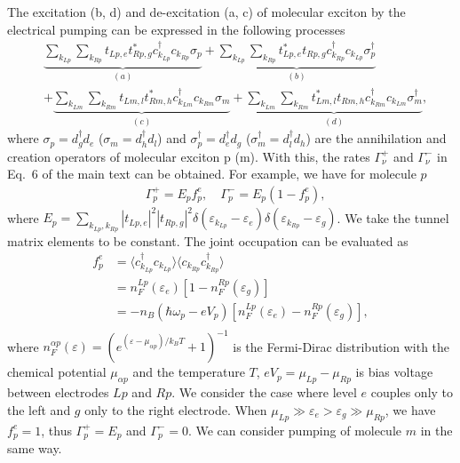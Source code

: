 \documentclass[aps,prb,
superscriptaddress,
,floatfix,footinbib,longbibliography,
preprint
]{revtex4-2}
\begin{document}
{The excitation (b, d) and de-excitation (a, c) of molecular exciton by the electrical pumping can be expressed in the following processes 
\begin{equation}
\begin{split}
&\underbrace{\sum_{k_{Lp}}\sum_{k_{Rp}}t_{Lp,e}t_{Rp,g}^{\ast}c_{k_{Lp}}^{\dagger}c_{k_{Rp}}\sigma_p}_{(a)}+\underbrace{\sum_{k_{Lp}}\sum_{k_{Rp}}t_{Lp,e}^{\ast}t_{Rp,g}c_{k_{Rp}}^{\dagger}c_{k_{Lp}}\sigma_p^\dagger}_{(b)}\\
&+\underbrace{\sum_{k_{Lm}}\sum_{k_{Rm}}t_{Lm,l}t_{Rm,h}^{\ast}c_{k_{Lm}}^{\dagger}c_{k_{Rm}}\sigma_m}_{(c)}+\underbrace{\sum_{k_{Lm}}\sum_{k_{Rm}}t_{Lm,l}^{\ast}t_{Rm,h}c_{k_{Rm}}^{\dagger}c_{k_{Lm}}\sigma_m^\dagger}_{(d)},
\end{split}
\label{exciton-electrode}
\end{equation}
where $\sigma_p = d_{g}^{\dagger}d_{e}$ ($\sigma_m=d_{h}^{\dagger}d_{l}$) and $\sigma_p^\dagger=d_{e}^{\dagger}d_{g}$ ($\sigma_m^\dagger=d_{l}^{\dagger}d_{h}$) are the annihilation and creation operators of molecular exciton p (m).   
With this, the rates $\Gamma_{\nu}^{+}$ and $\Gamma_{\nu}^{-}$ in Eq.~6 of the main text can be obtained. For example, we have for molecule $p$
\begin{equation}
\begin{split}
&\Gamma_{p}^{+}=E_{p}f_{p}^{e},
\quad \Gamma_{p}^{-}=E_{p}(1-f_{p}^{e}),
\end{split}
\end{equation}
where $E_{p}=\sum_{k_{Lp},k_{Rp}}|t_{Lp,e}|^2 |t_{Rp,g}|^2\delta(\varepsilon_{k_{Lp}}-\varepsilon_e)\delta(\varepsilon_{k_{Rp}}-\varepsilon_g)$. We take the tunnel matrix elements to be constant.
The joint occupation can be evaluated as
\begin{equation}
\begin{split}
f_{p}^{e}&=
\langle c_{k_{Lp}}^{\dagger}c_{k_{Lp}}\rangle \langle c_{k_{Rp}} c_{k_{Rp}}^{\dagger}\rangle\\
&=n_{F}^{Lp}(\varepsilon_{e})[1-n^{Rp}_{F}(\varepsilon_{g})]\\
&=-n_{B}(\hbar\omega_{p}-eV_{p})[n^{Lp}_{F}(\varepsilon_{e})-n^{Rp}_{F}(\varepsilon_{g})],\\
\end{split}
\end{equation}
where $n_{F}^{\alpha p}(\varepsilon)=(e^{(\varepsilon-\mu_{\alpha  p})/k_{B}T}+1)^{-1}$ is the  Fermi-Dirac distribution with the chemical potential $\mu_{\alpha p}$ and the temperature $T$,  
$eV_{p}=\mu_{Lp}-\mu_{Rp}$ is bias voltage between electrodes $Lp$ and $Rp$. We consider the case where level $e$ couples only to the left and $g$ only to the right electrode. When $\mu_{Lp} \gg \varepsilon_e > \varepsilon_g \gg \mu_{Rp}$, we have $f_p^e = 1$, thus $\Gamma_p^+=E_{p}$ and $\Gamma_p^-=0$. We can consider pumping of molecule $m$ in the same way.

}
\end{document}
